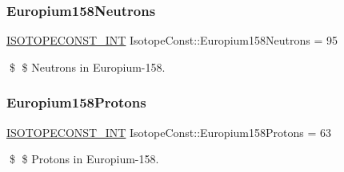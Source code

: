 \subsubsection{\texorpdfstring{Europium158\+Neutrons}{Europium158Neutrons}}
{\footnotesize\ttfamily \mbox{\hyperlink{group___isotope_const-_macros_ga5f18360b3e99483a35c32d789e62621c}{I\+S\+O\+T\+O\+P\+E\+C\+O\+N\+S\+T\+\_\+\+I\+NT}} Isotope\+Const\+::\+Europium158\+Neutrons = 95}

\$ \$ Neutrons in Europium-\/158. \mbox{\label{group___isotope_const-_europium-_eu158_gabb17009bc496ddea9a9d61910b55bc4b}} 
\subsubsection{\texorpdfstring{Europium158\+Protons}{Europium158Protons}}
{\footnotesize\ttfamily \mbox{\hyperlink{group___isotope_const-_macros_ga5f18360b3e99483a35c32d789e62621c}{I\+S\+O\+T\+O\+P\+E\+C\+O\+N\+S\+T\+\_\+\+I\+NT}} Isotope\+Const\+::\+Europium158\+Protons = 63}

\$ \$ Protons in Europium-\/158. 